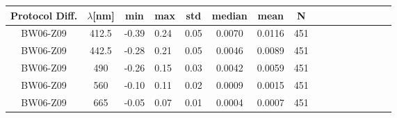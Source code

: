 \documentclass[preview]{standalone}
\begin{document}
\footnotesize
\centering
\setlength\tabcolsep{3pt} %
\begin{table}
\begin{tabular}{@{\extracolsep{4pt}}ScSlScScScScScSc @{}}
\hline
Protocol Diff. & $\lambda$[nm] & min & max & std & median & mean  & N\\ \hline
BW06-Z09 & 412.5 & -0.39 & 0.24 & 0.05 & 0.0070 & 0.0116 & 451\\
BW06-Z09 & 442.5 & -0.28 & 0.21 & 0.05 & 0.0046 & 0.0089 & 451\\
BW06-Z09 & 490   & -0.26 & 0.15 & 0.03 & 0.0042 & 0.0059 & 451\\
BW06-Z09 & 560   & -0.10 & 0.11 & 0.02 & 0.0009 & 0.0015 & 451\\
BW06-Z09 & 665   & -0.05 & 0.07 & 0.01 & 0.0004 & 0.0007 & 451\\\hline


\end{tabular}
\end{table}
\end{document}
